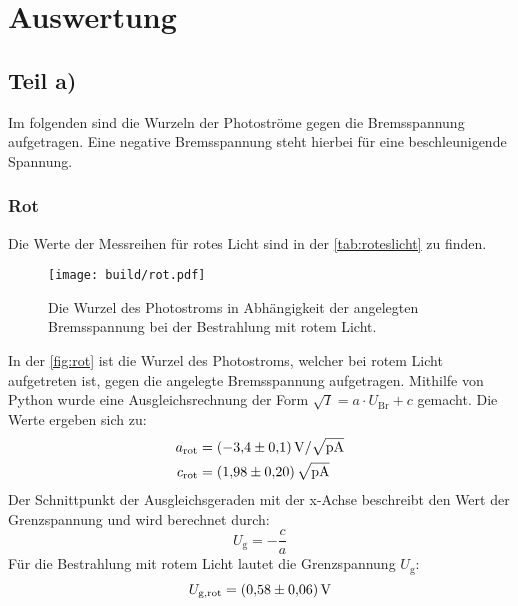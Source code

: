 \section{Auswertung}
\label{sec:Auswertung}
\subsection{Teil a)}
Im folgenden sind die Wurzeln der Photoströme gegen die Bremsspannung aufgetragen. 
Eine negative Bremsspannung steht hierbei für eine beschleunigende Spannung.
\subsubsection{Rot}
Die Werte der Messreihen für rotes Licht sind in der \autoref{tab:roteslicht} zu finden.
\begin{figure}[H]
  \centering
  \texttt{[image: build/rot.pdf]}
  \caption{Die Wurzel des Photostroms in Abhängigkeit der angelegten Bremsspannung bei der Bestrahlung mit rotem Licht.}
  \label{fig:rot}
\end{figure}
\noindent
In der \autoref{fig:rot} ist die Wurzel des Photostroms, welcher bei rotem Licht aufgetreten ist, gegen die angelegte Bremsspannung aufgetragen.
Mithilfe von Python wurde eine Ausgleichsrechnung der Form $\sqrt{I} = a \cdot U_{\text{Br}} + c $ gemacht.
Die Werte ergeben sich zu:
\begin{align*}
  a_{\text{rot}} &= \SI{-3.4 \pm 0.1}{\volt\per\sqrt{\pico\ampere}}\\
  c_{\text{rot}} &= \SI{1.98 \pm 0.2}{\sqrt{\pico\ampere}}
\end{align*}
Der Schnittpunkt der Ausgleichsgeraden mit der x-Achse beschreibt den Wert der Grenzspannung und wird berechnet durch:
\begin{equation}\label{eqn:U_G}
  U_{\text{g}}=-\frac{c}{a}
\end{equation}
Für die Bestrahlung mit rotem Licht lautet die Grenzspannung $U_{\text{g}}$:
\begin{equation*}
  U_{\text{g},\text{rot}} = \SI{0.58\pm0.06}{\volt}
\end{equation*}

